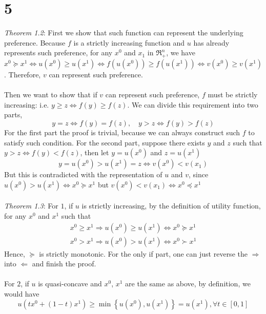 \documentclass[12pt]{article}
\begin{document}
\section*{5}
\emph{Theorem 1.2}: First we show that such function can represent the underlying preference. Because $f$ is a strictly increasing function and $u$ has already represents such preference, for any $x^0$ and $x_1$ in $\Re_+^n$, we have $x^0\succeq x^1\Leftrightarrow u(x^0)\geq u(x^1)\Leftrightarrow f(u(x^0))\geq f(u(x^1))\Leftrightarrow v(x^0)\geq v(x^1)$. Therefore, $v$ can represent such preference.\\
\\
Then we want to show that if $v$ can represent such preference, $f$ must be strictly increasing: i.e. $y\geq z\Leftrightarrow f(y)\geq f(z)$. We can divide this requirement into two parts,
\begin{equation*}
y=z\Leftrightarrow f(y)=f(z),\quad y>z\Leftrightarrow f(y)>f(z)
\end{equation*}
For the first part the proof is trivial, because we can always construct such $f$ to satisfy such condition. For the second part, suppose there exists $y$ and $z$ such that $y>z\Leftrightarrow f(y)<f(z)$, then let $y=u(x^0)$ and $z=u(x^1)$
\begin{equation*}
y=u(x^0)>u(x^1)=z\Leftrightarrow v(x^0)<v(x_1)
\end{equation*}
But this is contradicted with the representation of $u$ and $v$, since $u(x^0)>u(x^1)\Leftrightarrow x^0\succeq x^1$ but $v(x^0)<v(x_1)\Leftrightarrow x^0\preceq x^1$\\
\\
\emph{Theorem 1.3}: For $1$, if $u$ is strictly increasing, by the definition of utility function, for any $x^0$ and $x^1$ such that
\begin{align*}
x^0\geq x^1\Rightarrow u(x^0)\geq u(x^1)\Leftrightarrow x^0\succeq x^1\\
x^0>x^1\Rightarrow u(x^0)>u(x^1)\Leftrightarrow x^0\succ x^1
\end{align*}
Hence, $\succeq$ is strictly monotonic. For the only if part, one can just reverse the $\Rightarrow$ into $\Leftarrow$ and finish the proof.\\
\\
For $2$, if $u$ is quasi-concave and $x^0$, $x^1$ are the same as above, by definition, we would have
\begin{equation*}
u\left(tx^0+(1-t)x^1\right) \geq \min \left\{u\left(x^0\right), u\left(x^1\right)\right\}=u(x^1), \forall t \in[0,1]
\end{equation*}
\end{document}
